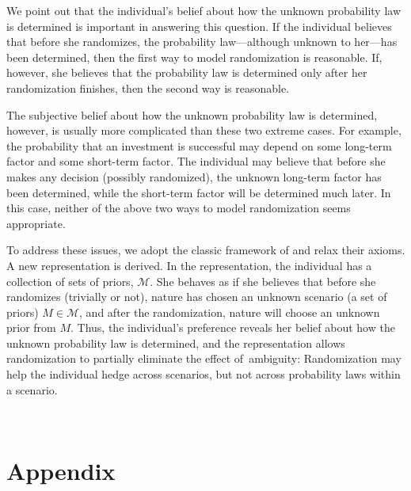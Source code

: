 \documentclass[12pt, notitlepage]{article}
\begin{document}
We point out that the individual's belief about how the unknown probability
law is determined is important in answering this question. If the individual
believes that before she randomizes, the probability law---although unknown
to her---has been determined, then the first way to model randomization is
reasonable. If, however, she believes that the probability law is determined
only after her randomization finishes, then the second way is reasonable.

The subjective belief about how the unknown probability law is determined,
however, is usually more complicated than these two extreme cases. For
example, the probability that an investment is successful may depend on some
long-term factor and some short-term factor. The individual may believe that
before she makes any decision (possibly randomized), the unknown long-term
factor has been determined, while the short-term factor will be determined
much later. In this case, neither of the above two ways to model
randomization seems appropriate.

To address these issues, we adopt the classic framework of \cite{AA63} and
relax their axioms. A new representation is derived. In the representation,
the individual has a collection of sets of priors, $\mathcal{M}$. She
behaves as if she believes that before she randomizes (trivially or not),
nature has chosen an unknown scenario (a set of priors) $M\in \mathcal{M}$,
and after the randomization, nature will choose an unknown prior from $M$.
Thus, the individual's preference reveals her belief about how the unknown
probability law is determined, and the representation allows randomization
to partially eliminate the effect of\ ambiguity: Randomization may help the
individual hedge across scenarios, but not across probability laws within a
scenario.\newpage

{ }

{\ 


\pagebreak }

{\appendix
}

\section{Appendix}
\end{document}
